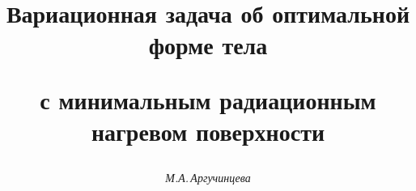 









\newcommand{\la}{\langle}


\newcommand{\ra}{\rangle}


\newcommand{\tg}{\operatorname{tg}}


\newcommand{\const}{\operatorname{const}}


\newcommand{\tts}[1]{}









\setcounter{page}{3}















\author{\it М.А.\,Аргучинцева}




\title{Вариационная задача об оптимальной форме тела


с минимальным радиационным нагревом поверхности}





\date{}




\pagestyle{plain} %







